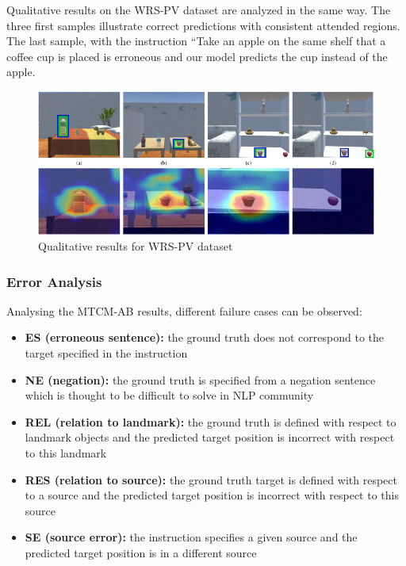 Qualitative results on the WRS-PV dataset are analyzed in the same way.
The three first samples illustrate correct predictions with consistent
attended regions. The last sample, with the instruction ``Take an apple
on the same shelf that a coffee cup is placed is erroneous and our
model predicts the cup instead of the apple.

\begin{figure}[h!]
\centering
\includegraphics[width=0.8\linewidth]{images/MTMCqualres2.png}
\caption{Qualitative results for WRS-PV dataset}
\end{figure}

\subsubsection{Error Analysis}\label{header-n344}

Analysing the MTCM-AB results, different failure cases can be observed:

\begin{itemize}
\item
  \textbf{ES (erroneous sentence):} the ground truth does not correspond
  to the target specified in the instruction
\item
  \textbf{NE (negation):} the ground truth is specified from a negation
  sentence which is thought to be difficult to solve in NLP community
\item
  \textbf{REL (relation to landmark):} the ground truth is defined with
  respect to landmark objects and the predicted target position is
  incorrect with respect to this landmark
\item
  \textbf{RES (relation to source):} the ground truth target is defined
  with respect to a source and the predicted target position is
  incorrect with respect to this source
\item
  \textbf{SE (source error):} the instruction specifies a given source
  and the predicted target position is in a different source
\end{itemize}